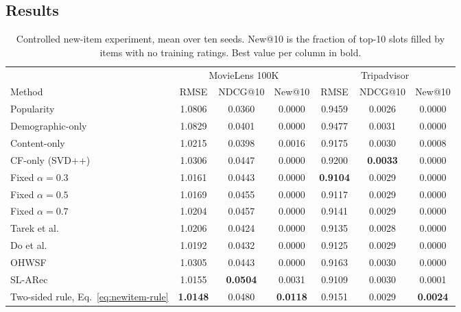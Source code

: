 \subsection{Results}

\begin{table}[t]
  \caption{Controlled new-item experiment, mean over ten seeds. New@10 is the fraction of top-10 slots filled by items with no training ratings. Best value per column in bold.}
  \label{tab:newitem}
  \centering
  \small
  \setlength{\tabcolsep}{4.5pt}
  \begin{tabular}{l ccc ccc}
    \toprule
    & \multicolumn{3}{c}{MovieLens 100K} & \multicolumn{3}{c}{Tripadvisor} \\
    \cmidrule(lr){2-4}\cmidrule(lr){5-7}
    Method & RMSE & NDCG@10 & New@10 & RMSE & NDCG@10 & New@10 \\
    \midrule
    Popularity                 & 1.0806 & 0.0360 & 0.0000 & 0.9459 & 0.0026 & 0.0000 \\
    Demographic-only           & 1.0829 & 0.0401 & 0.0000 & 0.9477 & 0.0031 & 0.0000 \\
    Content-only               & 1.0215 & 0.0398 & 0.0016 & 0.9175 & 0.0030 & 0.0008 \\
    CF-only (SVD++)            & 1.0306 & 0.0447 & 0.0000 & 0.9200 & \textbf{0.0033} & 0.0000 \\
    Fixed $\alpha = 0.3$       & 1.0161 & 0.0443 & 0.0000 & \textbf{0.9104} & 0.0029 & 0.0000 \\
    Fixed $\alpha = 0.5$       & 1.0169 & 0.0455 & 0.0000 & 0.9117 & 0.0029 & 0.0000 \\
    Fixed $\alpha = 0.7$       & 1.0204 & 0.0457 & 0.0000 & 0.9141 & 0.0029 & 0.0000 \\
    Tarek et al.~\cite{tarek2022} & 1.0206 & 0.0424 & 0.0000 & 0.9135 & 0.0028 & 0.0000 \\
    Do et al.~\cite{do2020}    & 1.0192 & 0.0432 & 0.0000 & 0.9125 & 0.0029 & 0.0000 \\
    OHWSF~\cite{ohwsf2025}     & 1.0305 & 0.0443 & 0.0000 & 0.9163 & 0.0030 & 0.0000 \\
    SL-ARec~\cite{slarec2026}  & 1.0155 & \textbf{0.0504} & 0.0031 & 0.9109 & 0.0030 & 0.0001 \\
    \midrule
    Two-sided rule, Eq.~\eqref{eq:newitem-rule} & \textbf{1.0148} & 0.0480 & \textbf{0.0118} & 0.9151 & 0.0029 & \textbf{0.0024} \\
    \bottomrule
  \end{tabular}
\end{table}

